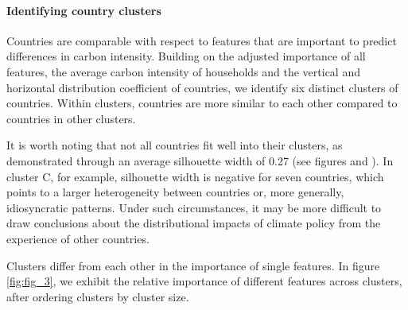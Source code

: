 \documentclass[12pt, a4paper]{article}
\begin{document}
\begin{figure}[ht!]
\end{figure}

\clearpage

\paragraph{Identifying country clusters}

Countries are comparable with respect to features that are important to predict differences in carbon intensity. Building on the adjusted importance of all features, the average carbon intensity of households and the vertical and horizontal distribution coefficient of countries, we identify six distinct clusters of countries. Within clusters, countries are more similar to each other compared to countries in other clusters. 

It is worth noting that not all countries fit well into their clusters, as demonstrated through an average silhouette width of 0.27 (see figures  and ). In cluster C, for example, silhouette width is negative for seven countries, which points to a larger heterogeneity between countries or, more generally, idiosyncratic patterns. Under such circumstances, it may be more difficult to draw conclusions about the distributional impacts of climate policy from the experience of other countries. 

Clusters differ from each other in the importance of single features. In figure \ref{fig:fig_3}, we exhibit the relative importance of different features across clusters, after ordering clusters by cluster size. 
\end{document}
